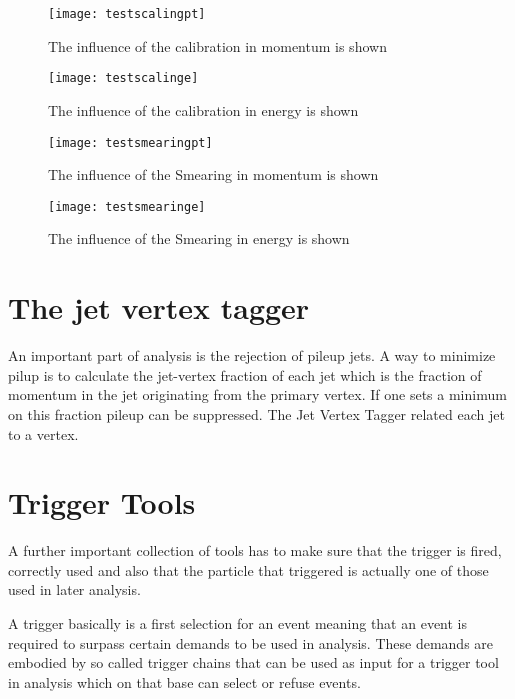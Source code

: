 \begin{figure}
\centering
\texttt{[image: testscalingpt]}
\caption[Influence of the JES on the transversal momentum]{The influence of the calibration in momentum is shown}
\label{fig:testscalingpt}
\end{figure}

\begin{figure}
\centering
\texttt{[image: testscalinge]}
\caption[Influence of the JES on the energy]{The influence of the calibration in energy is shown}
\label{fig:testscalinge}
\end{figure}


\begin{figure}
\centering
\texttt{[image: testsmearingpt]}
\caption[Influence of the Smearing on the transversal momentum]{The influence of the Smearing in momentum is shown}
\label{fig:testsmearingpt}
\end{figure}

\begin{figure}
\centering
\texttt{[image: testsmearinge]}
\caption[Influence of the Smearing on the energy]{The influence of the Smearing in energy is shown}
\label{fig:testsmearinge}
\end{figure}



\section{The jet vertex tagger}

An important part of analysis is the rejection of pileup jets. A way to minimize pilup is to calculate the jet-vertex fraction of each jet which is the fraction of momentum in the jet originating from the primary vertex. If one sets a minimum on this fraction pileup can be suppressed. The Jet Vertex Tagger related each jet to a vertex.

\section{Trigger Tools}

A further important collection of tools has to make sure that the trigger is fired, correctly used and also that the particle that triggered is actually one of those used in later analysis.

A trigger basically is a first selection for an event meaning that an event is required to surpass certain demands to be used in analysis. These demands are embodied by so called trigger chains that can be used as input for a trigger tool in analysis which on that base can select or refuse events.

